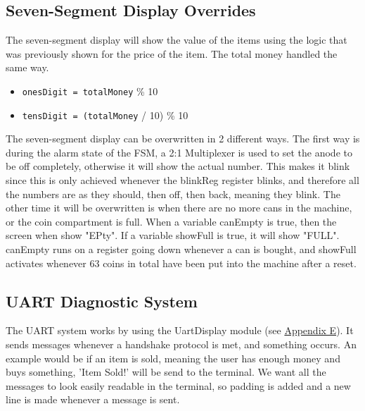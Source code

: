 \subsection{Seven-Segment Display Overrides}
\label{SevenSeg}
The seven-segment display will show the value of the items using the logic that was previously shown for the price of the item. The total money handled the same way.
\begin{itemize}
    \item \texttt{onesDigit = totalMoney} \% 10
    \item \texttt{tensDigit = (totalMoney} / 10) \% 10
\end{itemize}
The seven-segment display can be overwritten in 2 different ways. The first way is during the alarm state of the FSM, a 2:1 Multiplexer is used to set the anode to be off completely, otherwise it will show the actual number. This makes it blink since this is only achieved whenever the blinkReg register blinks, and therefore all the numbers are as they should, then off, then back, meaning they blink. 
The other time it will be overwritten is when there are no more cans in the machine, or the coin compartment is full. When a variable canEmpty is true, then the screen when show "EPty". If a variable showFull is true, it will show "FULL". canEmpty runs on a register going down whenever a can is bought, and showFull activates whenever 63 coins in total have been put into the machine after a reset.

\subsection{UART Diagnostic System}
The UART system works by using the UartDisplay module (see \hyperref[sec:app_uartdisplay]{Appendix E}). It sends messages whenever a handshake protocol is met, and something occurs. An example would be if an item is sold, meaning the user has enough money and buys something, 'Item Sold!' will be send to the terminal. We want all the messages to look easily readable in the terminal, so padding is added and a new line is made whenever a message is sent.